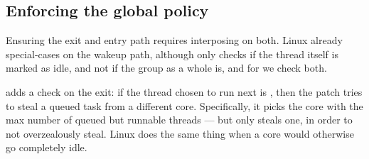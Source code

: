 \subsection{Enforcing the global policy}

Ensuring the exit and entry path requires interposing on both. Linux already
special-cases on the wakeup path, although only checks if the thread itself is
marked as idle, and not if the group as a whole is, and for \schedbe{} we check
both.

\schedbe{} adds a check on the exit: if the thread chosen to run next is
\schedbe{}, then the patch tries to steal a queued \schednormal{} task from a
different core. Specifically, it picks the core with the max number of queued
but runnable \schednormal{} threads --- but only steals one, in order to not
overzealously steal. Linux does the same thing when a core would otherwise go
completely idle.